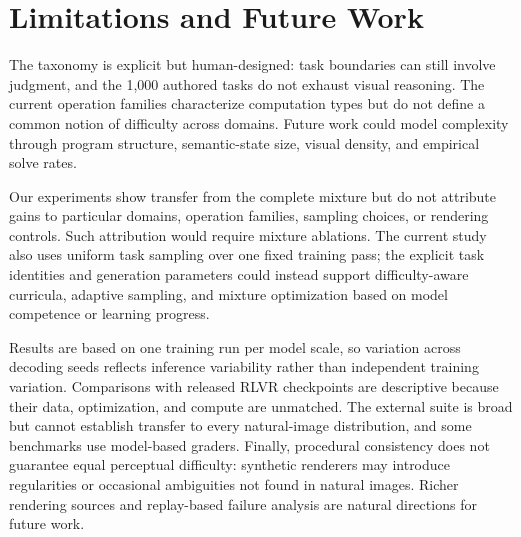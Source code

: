 \section{Limitations and Future Work}
\label{sec:limitations}

The \trace taxonomy is explicit but human-designed: task boundaries can still
involve judgment, and the 1,000 authored tasks do not exhaust visual reasoning.
The current operation families characterize computation types but do not define
a common notion of difficulty across domains. Future work could model complexity
through program structure, semantic-state size, visual density, and empirical
solve rates.

Our experiments show transfer from the complete \trace mixture but do not
attribute gains to particular domains, operation families, sampling choices, or
rendering controls. Such attribution would require mixture ablations. The
current study also uses uniform task sampling over one fixed training pass;
the explicit task identities and generation parameters could instead support
difficulty-aware curricula, adaptive sampling, and mixture optimization based on
model competence or learning progress.

Results are based on one training run per model scale, so variation across
decoding seeds reflects inference variability rather than independent training
variation. Comparisons with released RLVR checkpoints are descriptive because
their data, optimization, and compute are unmatched. The external suite is broad
but cannot establish transfer to every natural-image distribution, and some
benchmarks use model-based graders. Finally, procedural consistency does not
guarantee equal perceptual difficulty: synthetic renderers may introduce
regularities or occasional ambiguities not found in natural images. Richer
rendering sources and replay-based failure analysis are natural directions for
future work.